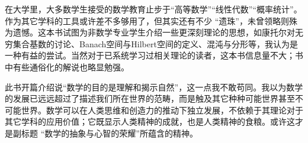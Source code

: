 \par 在大学里，大多数学生接受的数学教育止步于“高等数学”“线性代数”“概率统计”。作为其它学科的工具或许差不多够用了，但其实还有不少 “遗珠”，未曾领略则殊为遗憾。这本书试图为非数学专业学生介绍一些更深刻理论的思想，如康托尔对无穷集合基数的讨论、Banach空间与Hilbert空间的定义、混沌与分形等，我认为是一种有益的尝试。当然对于已系统学习过相关理论的读者，这本书信息量不大；书中有些通俗化的解说也略显勉强。
\par 此书开篇介绍说“数学的目的是理解和揭示自然”，这一点我不敢苟同。我以为数学的发展已远远超过了描述我们所在世界的范畴，而是触及其它种种可能世界甚至不可能世界。数学可以在人类思维和创造力的推动下独立发展，不依赖于其理论对于其它学科的应用价值；它既显示人类精神的成就，也是人类精神的食粮。或许这才是副标题 “数学的抽象与心智的荣耀”所蕴含的精神。
\par {}


